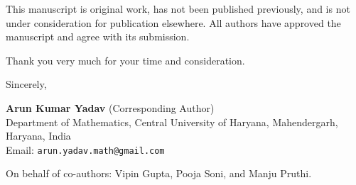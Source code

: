 \documentclass[11pt]{article}
\begin{document}
This manuscript is original work, has not been published previously, and is not under consideration for publication elsewhere. All authors have approved the manuscript and agree with its submission.

Thank you very much for your time and consideration.

\vspace{2em}
\noindent Sincerely,

\vspace{1em}
\noindent\textbf{Arun Kumar Yadav} (Corresponding Author)\\
Department of Mathematics, Central University of Haryana, Mahendergarh, Haryana, India\\
Email: \texttt{arun.yadav.math@gmail.com}

\vspace{1em}
\noindent On behalf of co-authors: Vipin Gupta, Pooja Soni, and Manju Pruthi.
\end{document}
